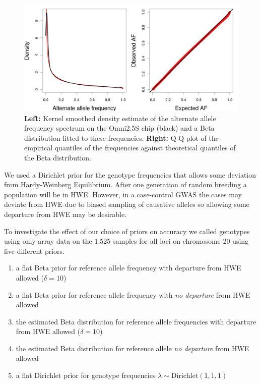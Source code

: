 \begin{figure}[h]
\begin{center} 
\includegraphics[width=\textwidth]{chap2figs/SupFig2}
\caption[Allele frequency spectrum on Omni2.5S chip]{\textbf{Left:} Kernel smoothed density estimate of the alternate allele frequency spectrum on the Omni2.5S chip (black) and a Beta distribution fitted to these frequencies.  \textbf{Right:} Q-Q plot of the empirical quantiles of the frequencies against theoretical quantiles of the Beta distribution.
\label{AFS_betafit}}
\end{center} 
\end{figure}
\clearpage
We used a Dirichlet prior for the genotype frequencies that allows some deviation from Hardy-Weinberg Equilibrium. After one generation of random breeding a population will be in HWE.  However, in a case-control GWAS the cases may deviate from HWE due to biased sampling of causative alleles so allowing some departure from HWE may be desirable.

To investigate the effect of our choice of priors on accuracy we called genotypes using only array data on the 1,525 samples for all loci on chromosome 20 using five different priors. 

\begin{enumerate}\label{freqpriorlist}
\item a flat Beta prior for reference allele frequency with departure from HWE allowed ($\delta=10$)
\item a flat Beta prior for reference allele frequency with \emph{no departure} from HWE allowed
\item the estimated Beta distribution for reference allele frequencies with departure from HWE allowed ($\delta=10$)
\item the estimated Beta distribution for reference allele  \emph{no departure} from HWE allowed
\item a flat Dirichlet prior for genotype frequencies $\lambda \sim \textrm{Dirichlet}(1,1,1)$
\end{enumerate}

